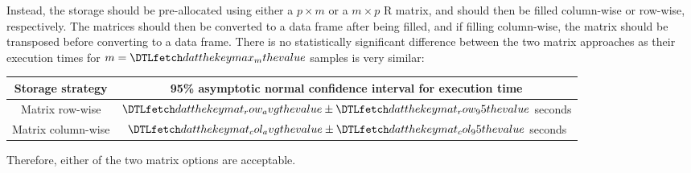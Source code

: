 \documentclass[12pt]{article}
\begin{document}
Instead, the storage should be pre-allocated using either a $p \times m$ or a $m \times p$ R matrix, and should then be filled
column-wise or row-wise, respectively. The matrices should then be converted to a data frame after being filled, and if filling column-wise, the matrix should be transposed before converting to a data frame.
There is no statistically significant difference between the two matrix approaches as their execution times for $m=\dat{max_m}$ samples
is very similar:
\begin{center}
    \begin{tabular}{c|c}
        \textbf{Storage strategy} & \textbf{95\% asymptotic normal confidence interval for execution time} \\
        \hline
        Matrix row-wise & $\dat{mat_row_avg}\pm\dat{mat_row_95}$ seconds \\
        Matrix column-wise & $\dat{mat_col_avg}\pm\dat{mat_col_95}$ seconds
    \end{tabular}
\end{center}

Therefore, either of the two matrix options are acceptable.
\end{document}
